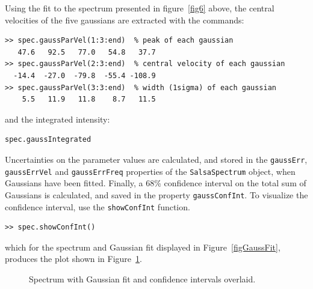 \documentclass[11pt,a4paper]{article}
\begin{document}
Using the fit to the spectrum presented in figure~\ref{fig6} above,
the central velocities of the five gaussians are extracted with the
commands:
\begin{lstlisting}
>> spec.gaussParVel(1:3:end)  % peak of each gaussian
   47.6   92.5   77.0   54.8   37.7
>> spec.gaussParVel(2:3:end)  % central velocity of each gaussian
  -14.4  -27.0  -79.8  -55.4 -108.9
>> spec.gaussParVel(3:3:end)  % width (1sigma) of each gaussian
    5.5   11.9   11.8    8.7   11.5
\end{lstlisting}
and the integrated intensity:
\begin{lstlisting}
spec.gaussIntegrated
\end{lstlisting}

Uncertainties on the parameter values are calculated, and stored in
the \texttt{gaussErr}, \texttt{gaussErrVel} and \texttt{gaussErrFreq}
properties of the \texttt{SalsaSpectrum} object, when Gaussians have
been fitted. Finally, a 68\% confidence interval on the total sum of
Gaussians is calculated, and saved in the property
\texttt{gaussConfInt}. To visualize the confidence interval, use the
\texttt{showConfInt} function.
\begin{lstlisting}
>> spec.showConfInt()
\end{lstlisting}
which for the spectrum and Gaussian fit displayed in
Figure~\ref{figGaussFit}, produces the plot shown in
Figure~\ref{fig:confint}.

\begin{figure}[h!]
  \centering
  \caption{Spectrum with Gaussian fit and confidence intervals overlaid.}
  \label{fig:confint}
\end{figure}
\end{document}
